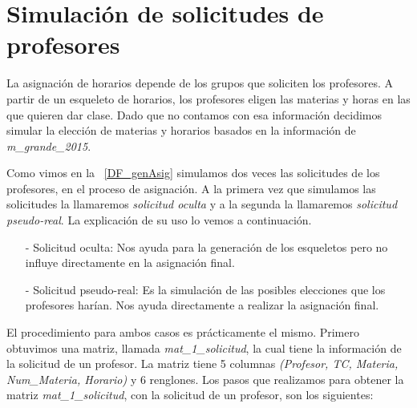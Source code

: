 \section{Simulación de solicitudes de profesores} \label{SimSolicitudesProfesores}

La asignación de horarios depende de los grupos que soliciten los profesores. A partir de un esqueleto de horarios, los profesores eligen las materias y horas en las que quieren dar clase. Dado que no contamos con esa información decidimos simular la elección de materias y horarios basados en la información de \textit{m\_grande\_2015}.

Como vimos en la \figurename{~\ref{DF_genAsig}} simulamos dos veces las solicitudes de los profesores, en el proceso de asignación. A la primera vez que simulamos las solicitudes la llamaremos \textit{solicitud oculta} y a la segunda la llamaremos \textit{solicitud pseudo-real}. La explicación de su uso lo vemos a continuación.

\begin{itemize}
\item[-] Solicitud oculta: Nos ayuda para la generación de los esqueletos pero no influye directamente en la asignación final.

\item[-] Solicitud pseudo-real: Es la simulación de las posibles elecciones que los profesores harían. Nos ayuda directamente a realizar la asignación final.
\end{itemize}

El procedimiento para ambos casos es prácticamente el mismo. Primero obtuvimos una matriz, llamada \textit{mat\_1\_solicitud}, la cual tiene la información de la solicitud de un profesor. La matriz tiene 5 columnas \textit{(Profesor, TC, Materia, Num\_Materia, Horario)} y 6 renglones. Los pasos que realizamos para obtener la matriz \textit{mat\_1\_solicitud}, con la solicitud de un profesor, son los siguientes:

